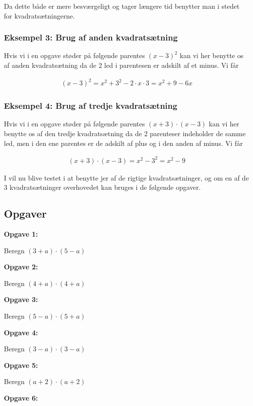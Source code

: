 Da dette både er mere besværgeligt og tager længere tid benytter man i stedet for kvadratsætningerne.

\subsubsection*{Eksempel 3: Brug af anden kvadratsætning}
Hvis vi i en opgave støder på følgende parentes $(x - 3)^2$ kan vi her benytte os af anden kvadratsætning da de 2 led i parentesen er adskilt af et minus. Vi får

\begin{align*}
(x - 3)^2 = x^2 + 3^2 -2\cdot x\cdot 3 = x^2 + 9 - 6x
\end{align*}

\subsubsection*{Eksempel 4: Brug af tredje kvadratsætning}
Hvis vi i en opgave støder på følgende parentes $(x + 3)\cdot(x - 3)$ kan vi her benytte os af den tredje kvadratsætning da de 2 parenteser indeholder de samme led, men i den ene parentes er de adskilt af plus og i den anden af minus. Vi får

\begin{align*}
(x + 3)\cdot (x - 3) = x^2 - 3^2 = x^2 - 9
\end{align*}


I vil nu blive testet i at benytte jer af de rigtige kvadratsætninger, og om en af de 3 kvadratsætninger overhovedet kan bruges i de følgende opgaver. 



\subsection*{Opgaver}


\textbf{Opgave 1:}

Beregn $(3+a) \cdot (5-a)$

\textbf{Opgave 2:}

Beregn $(4+a) \cdot (4+a)$

\textbf{Opgave 3:}

Beregn $(5-a) \cdot (5+a)$

\textbf{Opgave 4:}

Beregn $(3-a) \cdot (3-a)$

\textbf{Opgave 5:}

Beregn $(a + 2) \cdot (a + 2)$

\textbf{Opgave 6:}

